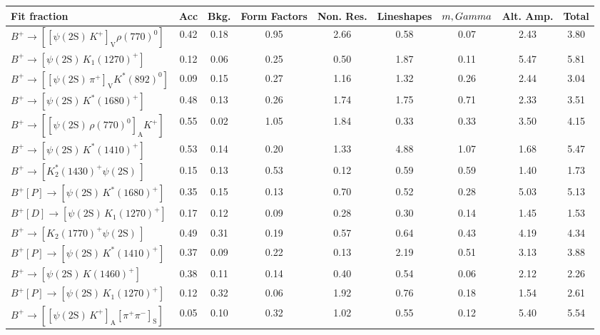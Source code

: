 \begin{tabular}{l  c  c  c  c  c  c  c  | c }
\hline
\hline
Fit fraction & Acc & Bkg. & Form Factors & Non. Res. & Lineshapes & $m,\\Gamma$ & Alt. Amp. &  Total  \\ 
\hline
$B^{+}\rightarrow \left[\left[\psi(\text{2S})\,K^{+}\right]_{\text{V}}\rho(770)^{0}\right]$ & 0.42 & 0.18 & 0.95 & 2.66 & 0.58 & 0.07 & 2.43 & 3.80 \\ 
$B^{+}\rightarrow \left[\psi(\text{2S})\,K_{1}(1270)^{+}\right]$ & 0.12 & 0.06 & 0.25 & 0.50 & 1.87 & 0.11 & 5.47 & 5.81 \\ 
$B^{+}\rightarrow \left[\left[\psi(\text{2S})\,\pi^{+}\right]_{\text{V}}K^{*}(892)^{0}\right]$ & 0.09 & 0.15 & 0.27 & 1.16 & 1.32 & 0.26 & 2.44 & 3.04 \\ 
$B^{+}\rightarrow \left[\psi(\text{2S})\,K^{*}(1680)^{+}\right]$ & 0.48 & 0.13 & 0.26 & 1.74 & 1.75 & 0.71 & 2.33 & 3.51 \\ 
$B^{+}\rightarrow \left[\left[\psi(\text{2S})\,\rho(770)^{0}\right]_{\text{A}}K^{+}\right]$ & 0.55 & 0.02 & 1.05 & 1.84 & 0.33 & 0.33 & 3.50 & 4.15 \\ 
$B^{+}\rightarrow \left[\psi(\text{2S})\,K^{*}(1410)^{+}\right]$ & 0.53 & 0.14 & 0.20 & 1.33 & 4.88 & 1.07 & 1.68 & 5.47 \\ 
$B^{+}\rightarrow \left[K_{2}^{*}(1430)^{+}\psi(\text{2S})\,\right]$ & 0.15 & 0.13 & 0.53 & 0.12 & 0.59 & 0.59 & 1.40 & 1.73 \\ 
$B^{+}\left[P\right]\rightarrow \left[\psi(\text{2S})\,K^{*}(1680)^{+}\right]$ & 0.35 & 0.15 & 0.13 & 0.70 & 0.52 & 0.28 & 5.03 & 5.13 \\ 
$B^{+}\left[D\right]\rightarrow \left[\psi(\text{2S})\,K_{1}(1270)^{+}\right]$ & 0.17 & 0.12 & 0.09 & 0.28 & 0.30 & 0.14 & 1.45 & 1.53 \\ 
$B^{+}\rightarrow \left[K_{2}(1770)^{+}\psi(\text{2S})\,\right]$ & 0.49 & 0.31 & 0.19 & 0.57 & 0.64 & 0.43 & 4.19 & 4.34 \\ 
$B^{+}\left[P\right]\rightarrow \left[\psi(\text{2S})\,K^{*}(1410)^{+}\right]$ & 0.37 & 0.09 & 0.22 & 0.13 & 2.19 & 0.51 & 3.13 & 3.88 \\ 
$B^{+}\rightarrow \left[\psi(\text{2S})\,K(1460)^{+}\right]$ & 0.38 & 0.11 & 0.14 & 0.40 & 0.54 & 0.06 & 2.12 & 2.26 \\ 
$B^{+}\left[P\right]\rightarrow \left[\psi(\text{2S})\,K_{1}(1270)^{+}\right]$ & 0.12 & 0.32 & 0.06 & 1.92 & 0.76 & 0.18 & 1.54 & 2.61 \\ 
$B^{+}\rightarrow \left[\left[\psi(\text{2S})\,K^{+}\right]_{\text{A}}\left[\pi^{+}\pi^{-}\right]_{\text{S}}\right]$ & 0.05 & 0.10 & 0.32 & 1.02 & 0.55 & 0.12 & 5.40 & 5.54 \\ 

\end{tabular}
